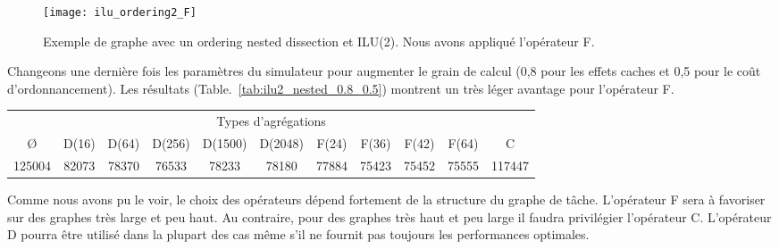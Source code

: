 \begin{figure}[t!]
  \centering
  \texttt{[image: ilu\_ordering2\_F]}
  \caption{Exemple de graphe avec un ordering nested dissection et ILU(2). Nous avons appliqué l'opérateur F.}
  \label{fig:ilu_ordering2_F}
\end{figure}


Changeons une dernière fois les paramètres du simulateur pour augmenter le grain de calcul (0,8 pour les effets caches et 0,5 pour le coût d'ordonnancement).
%
Les résultats (Table.~\ref{tab:ilu2_nested_0.8_0.5}) montrent un très léger avantage pour l'opérateur F.


\begin{center}
  \begin{tabular}{|c|c|c|c|c|c|c|c|c|c|c|}
    \hline
    \multicolumn{11}{|c|}{Types d'agrégations}\\
    \O & D(16) & D(64) & D(256) & D(1500) & D(2048) & F(24) & F(36) & F(42) & F(64) & C \\
    \hline
    125004 & 82073 & 78370 & 76533 & 78233 & 78180 & 77884 & 75423 & 75452 & 75555 & 117447 \\
    \hline
  \end{tabular}
  \label{tab:ilu2_nested_0.8_0.5}
\end{center}


Comme nous avons pu le voir, le choix des opérateurs dépend fortement de la structure du graphe de tâche.
%
L'opérateur F sera à favoriser sur des graphes très large et peu haut.
%
Au contraire, pour des graphes très haut et peu large il faudra privilégier l'opérateur C.
%
L'opérateur D pourra être utilisé dans la plupart des cas même s'il ne fournit pas toujours les performances optimales.
